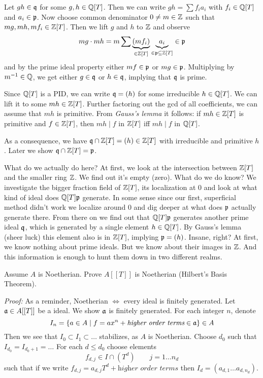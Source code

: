 Let $gh\in\mathfrak{q}$ for some $g,h\in \mathbb{Q}[T]$. Then we can write $gh=\sum f_ia_i$ with $f_i \in \mathbb{Q}[T]$ and $a_i \in\mathfrak{p}$. Now choose common denominator $0\neq m\in \mathbb{Z}$ such that $mg,mh, mf_i\in\mathbb{Z}[T]$. Then we lift $g$ and $h$ to $\mathbb{Z}$ and observe 
$$mg\cdot mh = m \sum \underbrace{(mf_i)}_{\in \mathbb{Z}[T]}\underbrace{a_i}_{\in\mathfrak{p}\subseteq \mathbb{Z}[T]} \in \mathfrak{p}$$ 
and by the prime ideal property either $mf\in \mathfrak{p}$ or $mg \in \mathfrak{p}$. Multiplying by $m^{-1}\in\mathbb{Q}$, we get either $g\in\mathfrak{q}$ or $h\in\mathfrak{q}$, implying that $\mathfrak{q}$ is prime.

Since $\mathbb{Q}[T]$ is a PID, we can write $\mathfrak{q} = (h)$ for some irreducible $h\in \mathbb{Q}[T]$. We can lift it to some $mh\in \mathbb{Z}[T]$. Further factoring out the gcd of all coefficients, we can assume that $mh$ is primitive. From \textit{Gauss's lemma} it follows: if $mh\in\mathbb{Z}[T]$ is primitive and $f \in\mathbb{Z}[T]$, then $mh\mid f$ in $\mathbb{Z}[T]$ iff $mh\mid f$ in $\mathbb{Q}[T]$.  

As a consequence, we have $\mathfrak{q} \cap \mathbb{Z}[T] = (h) \in \mathbb{Z}[T]$ with irreducible and primitive $h$. Later we show $\mathfrak{q} \cap \mathbb{Z}[T] = \mathfrak{p}$.

\begin{note}
     What do we actually do here? At first, we look at the intersection between $\mathbb{Z}[T]$ and the smaller ring $\mathbb{Z}$. We find out it's empty (zero). What do we do know? We investigate the bigger fraction field of $\mathbb{Z}[T]$, its localization at $0$ and look at what kind of ideal does $\mathbb{Q}[T] \mathfrak{p}$ generate. In some sense since our first, superficial method didn't work we localize around $0$ and dig deeper at what does $\mathfrak{p}$ actually generate there. From there on we find out that $\mathbb{Q}[T]\mathfrak{p}$ generates another prime ideal $\mathfrak{q}$, which is generated by a single element $h\in \mathbb{Q}[T]$. By Gauss's lemma (sheer luck) this element also is in $\mathbb{Z}[T]$, implying $\mathfrak{p} = (h)$. Insane, right? At first, we know nothing about prime ideals. But we know about their images in $\mathbb{Z}$. And this information is enough to hunt them down in two different realms.
\end{note}

\begin{exercise}
    Assume $A$ is Noetherian. Prove $A[[T]]$ is Noetherian (Hilbert's Basis Theorem).
\end{exercise}
\textit{Proof:} As a reminder, Noetherian $\iff$ every ideal is finitely generated. Let $\mathfrak{a} \in A[[T]]$ be a ideal. We show $\mathfrak{a}$ is finitely generated. For each integer $n$, denote
$$I_n=\{a\in A\mid f=ax^n+\textit{higher order terms}\in \mathfrak{a}\}\in A$$
Then we see that $I_0 \subset I_1 \subset \ldots$ stabilizes, as $A$ is Noetherian. Choose $d_0$ such that $I_{d_0}=I_{d_0+1}=\ldots$ For each $d\leq d_0$ choose elements 
$$f_{d,j}\in I\cap (T^d) \qquad j=1\ldots n_d$$
such that if we write $f_{d,j}=a_{d,j}T^d + \textit{higher order terms}$ then $I_d=(a_{d,1}\ldots a_{d,n_d})$.

